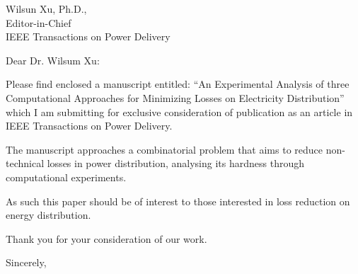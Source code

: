 \documentclass{letter}
\begin{document}
\begin{letter}{
Wilsun Xu, Ph.D.,\\
Editor-in-Chief\\
IEEE Transactions on Power Delivery
}

\opening{Dear Dr. Wilsum Xu:}

Please find enclosed a manuscript entitled:
``An Experimental Analysis of three Computational Approaches for Minimizing Losses on Electricity Distribution''
which I am submitting for exclusive consideration of publication as an article in IEEE Transactions on Power Delivery.

The manuscript approaches a combinatorial problem that aims to reduce non-technical losses in power distribution,
analysing its hardness through computational experiments.

As such this paper should be of interest to those interested in loss
reduction on energy distribution.

Thank you for your consideration of our work.

\closing{Sincerely,}


\end{letter}
\end{document}
